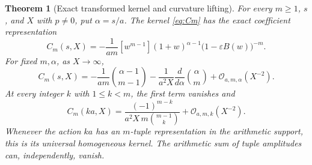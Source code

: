 \documentclass[11pt,a4paper]{article}
\numberwithin{equation}{section}
\newtheorem{theorem}{Theorem}[section]
\theoremstyle{definition}
\theoremstyle{remark}
\newcommand{\bigO}{\mathcal O}
\newcommand{\eps}{\varepsilon}
\begin{document}
\begin{theorem}[Exact transformed kernel and curvature lifting]
\label{thm:resonance}
For every $m\ge1$, $s$, and $X$ with $p\ne0$, put $\alpha=s/a$.
The kernel \eqref{eq:Cm} has the exact coefficient representation
\begin{equation}
 C_m(s,X)=-\frac1{am}[w^{m-1}]
  (1+w)^{\alpha-1}\bigl(1-\eps B(w)\bigr)^{-m}.
 \label{eq:transformedC}
\end{equation}
For fixed $m,\alpha$, as $X\to\infty$,
\begin{equation}
 C_m(s,X)=-\frac1{am}\binom{\alpha-1}{m-1}
 -\frac1{a^2X}\frac{d}{d\alpha}\binom{\alpha}{m}
 +\bigO_{a,m,\alpha}(X^{-2}).
 \label{eq:Cexpansion}
\end{equation}
At every integer $k$ with $1\le k<m$, the first term vanishes and
\begin{equation}
 C_m(ka,X)=
 \frac{(-1)^{m-k}}{a^2X\,m\binom{m-1}{k}}
 +\bigO_{a,m,k}(X^{-2}).
 \label{eq:resonant}
\end{equation}
Whenever the action $ka$ has an $m$-tuple representation in the
arithmetic support, this is its universal homogeneous kernel. The
arithmetic sum of tuple amplitudes can, independently, vanish.
\end{theorem}
\end{document}
